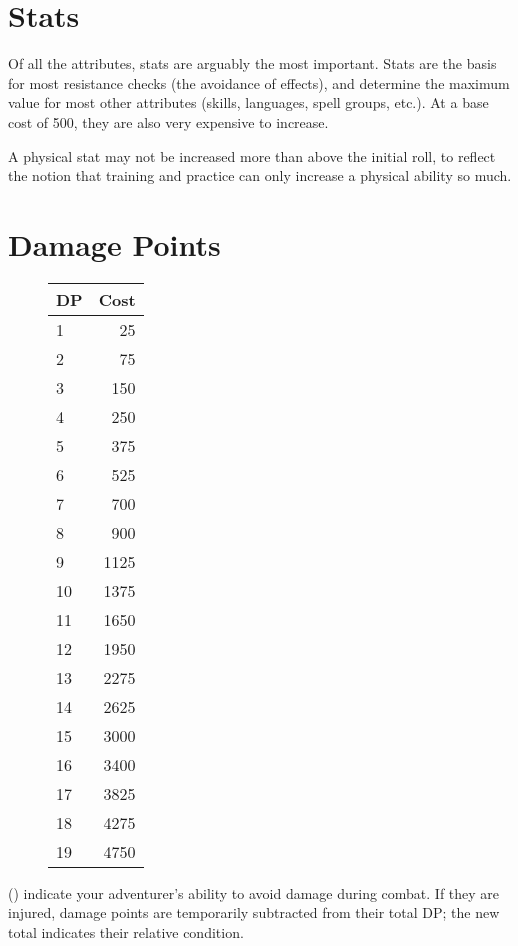 \vspace{10pt}
\begin{multicols*}{2}
\section{Stats}
Of all the attributes, stats are arguably the most important. Stats are the basis for most resistance checks (the avoidance of effects), and determine the maximum value for most other attributes (skills, languages, spell groups, etc.). At a base cost of 500, they are also very expensive to increase. 

A physical stat may not be increased more than  above the initial roll, to reflect the notion that training and practice can only increase a physical ability so much.
\section{Damage Points}
\begin{wrapfigure}[20]{l}[0pt]{50pt}
\begin{normbox}[Buying DP]
\small
\begin{tabular}{@{}l r}
\textbf{DP} & \textbf{Cost}\\
\midrule
1 & 25\\
2 & 75\\
3 & 150\\
4 & 250\\
5 & 375\\
6 & 525\\
7 & 700\\
8 & 900\\
9 & 1125\\
10 & 1375\\
11 & 1650\\
12 & 1950\\
13 & 2275\\
14 & 2625\\
15 & 3000\\
16 & 3400\\
17 & 3825\\
18 & 4275\\
19 & 4750\\
\end{tabular}
\end{normbox}
\end{wrapfigure}

 (\DP) indicate your adventurer's ability to avoid damage during combat.  If they are injured, damage points are temporarily subtracted from their total DP; the new total indicates their relative condition.


\end{multicols*}
